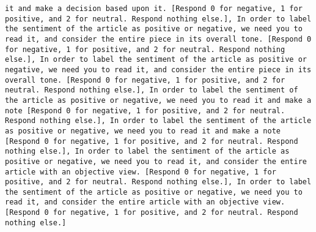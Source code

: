\begin{lstlisting}[label=lst:poor_performing_prompts]
it and make a decision based upon it. [Respond 0 for negative, 1 for positive, and 2 for neutral. Respond nothing else.], In order to label the sentiment of the article as positive or negative, we need you to read it, and consider the entire piece in its overall tone. [Respond 0 for negative, 1 for positive, and 2 for neutral. Respond nothing else.], In order to label the sentiment of the article as positive or negative, we need you to read it, and consider the entire piece in its overall tone. [Respond 0 for negative, 1 for positive, and 2 for neutral. Respond nothing else.], In order to label the sentiment of the article as positive or negative, we need you to read it and make a note [Respond 0 for negative, 1 for positive, and 2 for neutral. Respond nothing else.], In order to label the sentiment of the article as positive or negative, we need you to read it and make a note [Respond 0 for negative, 1 for positive, and 2 for neutral. Respond nothing else.], In order to label the sentiment of the article as positive or negative, we need you to read it, and consider the entire article with an objective view. [Respond 0 for negative, 1 for positive, and 2 for neutral. Respond nothing else.], In order to label the sentiment of the article as positive or negative, we need you to read it, and consider the entire article with an objective view. [Respond 0 for negative, 1 for positive, and 2 for neutral. Respond nothing else.]

\end{lstlisting}
